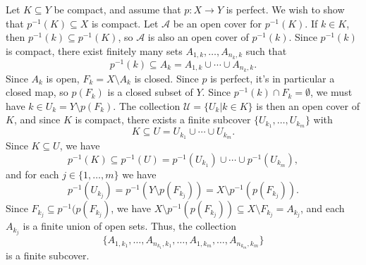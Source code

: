 \documentclass[letterpaper,12pt]{article}
\begin{document}
\begin{enumerate}
Let $K\subseteq Y$ be compact, and assume that $p:X\to Y$ is perfect. We wish to show that $p^{-1}(K)\subseteq X$ is compact. Let $\mathcal{A}$ be an open cover for $p^{-1}(K)$. If $k\in K$, then $p^{-1}(k)\subseteq p^{-1}(K)$, so $\mathcal{A}$ is also an open cover of $p^{-1}(k)$. Since $p^{-1}(k)$ is compact, there exist finitely many sets $A_{1,k},\ldots, A_{n_k,k}$ such that
\[
p^{-1}(k)\subseteq A_k = A_{1,k}\cup\cdots\cup A_{n_k,k}.
\]
Since $A_k$ is open, $F_k = X\setminus A_k$ is closed. Since $p$ is perfect, it's in particular a closed map, so $p(F_k)$ is a closed subset of $Y$. Since $p^{-1}(k)\cap F_k = \emptyset$, we must have $k\in U_k = Y\setminus p(F_k)$. The collection $\mathcal{U} = \{U_k|k\in K\}$ is then an open cover of $K$, and since $K$ is compact, there exists a finite subcover $\{U_{k_1},\ldots, U_{k_m}\}$ with
\[
K\subseteq U=U_{k_1}\cup \cdots \cup U_{k_m}.
\]
Since $K\subseteq U$, we have
\[
p^{-1}(K) \subseteq p^{-1}(U) = p^{-1}(U_{k_1})\cup \cdots \cup p^{-1}(U_{k_m}),
\]
and for each $j\in \{1,\ldots, m\}$ we have
\[
p^{-1}(U_{k_j}) = p^{-1}(Y\setminus p(F_{k_j})) = X\setminus p^{-1}(p(F_{k_j})).
\]
Since $F_{k_j}\subseteq p^{-1}(p(F_{k_j})$, we have $X\setminus p^{-1}(p(F_{k_j}))\subseteq X\setminus F_{k_j} = A_{k_j}$, and each $A_{k_j}$ is a finite union of open sets. Thus, the collection 
\[
\{A_{1,k_1},\ldots, A_{n_{k_1},k_1},\ldots, A_{1,k_m},\ldots, A_{n_{k_m},k_m}\}
\]
is a finite subcover.
\end{enumerate}
\end{document}
